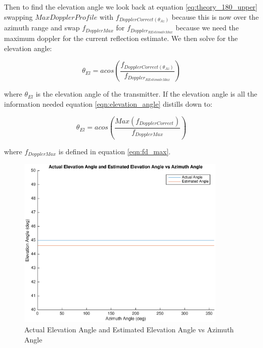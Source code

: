 Then to find the elevation angle we look back at equation \ref{eq:theory_180_upper} swapping $MaxDopplerProfile$ with $f_{DopplerCorrect(\theta_{Az})}$ because this is now over the azimuth range and swap $f_{DopplerMax}$ for $f_{Doppler_{R Estimate Max}}$ because we need the maximum doppler for the current reflection estimate. We then solve for the elevation angle:

\begin{equation}
	\theta_{El} = acos\left(\frac{f_{DopplerCorrect(\theta_{Az})}}{f_{Doppler_{R Estimate Max}}}\right)
	\label{eqn:elevation_angle}
\end{equation}

where $\theta_{El}$ is the elevation angle of the transmitter. If the elevation angle is all the information needed equation \ref{eqn:elevation_angle} distills down to:

\begin{equation}
	\theta_{El} = acos\left(\frac{Max(f_{DopplerCorrect})}{f_{DopplerMax}}\right)
	\label{eqn:elevation_angle_only}
\end{equation}

where $f_{DopplerMax}$ is defined in equation \ref{eqn:fd_max}.

\begin{figure}
	\begin{center}
		\includegraphics[width=10cm]{images/results/Elevation_angle_comparason_Azimuth_range.eps}
		\caption{Actual Elevation Angle and Estimated Elevation Angle vs Azimuth Angle}
		\label{fig:elevation_comparason_azimuth_range}
	\end{center}
\end{figure}

